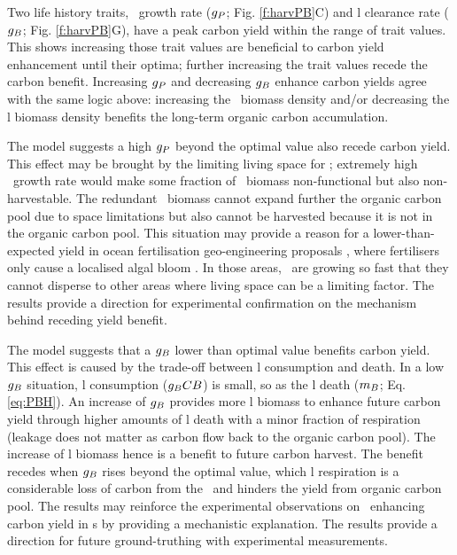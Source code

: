 \documentclass[env.tex]{subfiles}
\begin{document}
Two life history traits, \phy\ growth rate ($g_P$; Fig. \ref{f:harvPB}C) and \bac l clearance rate ($g_B$; Fig. \ref{f:harvPB}G), have a peak carbon yield within the range of trait values.  This shows increasing those trait values are beneficial to carbon yield enhancement until their optima; further increasing the trait values recede the carbon benefit.  Increasing $g_P$ and decreasing $g_B$ enhance carbon yields agree with the same logic above: increasing the \phy\ biomass density and/or decreasing the \bac l biomass density benefits the long-term organic carbon accumulation.

The model suggests a high $g_P$ beyond the optimal value also recede carbon yield.  This effect may be brought by the limiting living space for \phy; extremely high \phy\ growth rate would make some fraction of \phy\ biomass non-functional but also non-harvestable.  The redundant \phy\ biomass cannot expand further the organic carbon pool due to space limitations but also cannot be harvested because it is not in the organic carbon pool.  This situation may provide a reason for a lower-than-expected yield in ocean fertilisation geo-engineering proposals \autocite{boyd2008implications,gnanadesikan2008export,oschlies2010side}, where fertilisers only cause a localised algal bloom \autocite{gnanadesikan2008export,lawrence2014efficiency,trick2010iron,kwiatkowski2015atmospheric,lovelock2007ocean}.  In those areas, \phy\ are growing so fast that they cannot disperse to other areas where living space can be a limiting factor.  The results provide a direction for experimental confirmation on the mechanism behind receding yield benefit.

The model suggests that a $g_B$ lower than optimal value benefits carbon yield.  This effect is caused by the trade-off between \bac l consumption and death.  In a low $g_B$ situation, \bac l consumption ($g_B CB$) is small, so as the \bac l death ($m_B$; Eq. \ref{eq:PBH}).  An increase of $g_B$ provides more \bac l biomass to enhance future carbon yield through higher amounts of \bac l death with a minor fraction of respiration (leakage does not matter as carbon flow back to the organic carbon pool).  The increase of \bac l biomass hence is a benefit to future carbon harvest.  The benefit recedes when $g_B$ rises beyond the optimal value, which \bac l respiration is a considerable loss of carbon from the \pbs\ and hinders the yield from organic carbon pool.  The results may reinforce the experimental observations on \bac\ enhancing carbon yield in \pbs s \autocite{fuentes2016impact,santos2014microalgal} by providing a mechanistic explanation.  The results provide a direction for future ground-truthing with experimental measurements.
\end{document}
